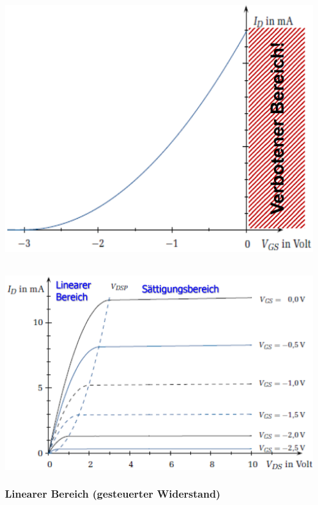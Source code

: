 \begin{minipage}[t]{0.43\columnwidth}
    \centering {} \\
    \includegraphics[align=c, width=\columnwidth]{images/jfet_eingangskennlinie.png}
\end{minipage}
\hfill
\begin{minipage}[t]{0.54\columnwidth}
    \centering {} \\
    \includegraphics[align=c, width=\columnwidth]{images/jfet_ausgangskennlinien.png}
\end{minipage}


\subsubsection{Linearer Bereich (gesteuerter Widerstand)}

